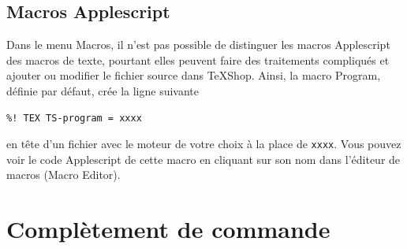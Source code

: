 \documentclass[11pt,french]{article}
\newcommand{\TS}{\textsf{\TeX Shop}}
\newcommand{\mnu}[1]{\textsf{#1}}
\begin{document}
\subsection{Macros Applescript}

Dans le menu \mnu{Macros}, il n'est pas possible de distinguer les macros Applescript des macros de texte, pourtant elles peuvent faire des traitements compliqués et ajouter ou modifier le fichier source dans \TS{}. Ainsi, la macro \mnu{Program}, définie par défaut, crée la ligne suivante
\begin{verbatim}
%! TEX TS-program = xxxx
\end{verbatim}
en tête d'un fichier avec le moteur de votre choix à la place de \texttt{xxxx}. Vous pouvez voir le code Applescript de cette macro en cliquant sur son nom dans l'éditeur de macros (\mnu{Macro Editor}). 




\section{Complètement de commande}\label{secCC}
\end{document}
